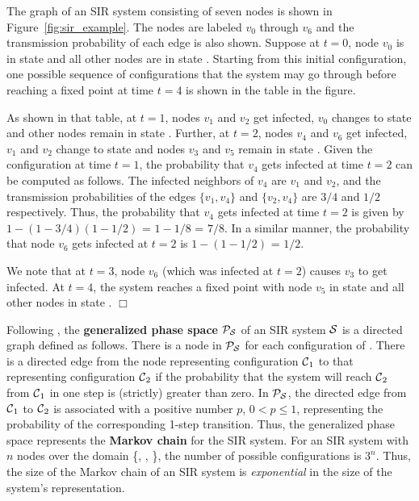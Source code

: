 \begin{example} \label{ex:sir_example}
The graph of an SIR system consisting of seven 
nodes is shown in Figure~\ref{fig:sir_example}.
The nodes are labeled $v_0$ through $v_6$ and the transmission
probability of each edge is also shown.
Suppose at $t = 0$, node $v_0$ is in state \istate{} and all
other nodes are in state \sstate. 
Starting from this initial configuration, one possible sequence of 
configurations that the system may
go through before reaching a fixed point at time $t = 4$ is shown
in the table in the figure.

As shown in that table, at $t = 1$, nodes $v_1$ and $v_2$ get infected,
$v_0$ changes to state \rstate{} and other nodes remain in state \sstate.
Further, at $t = 2$, nodes $v_4$ and $v_6$ get infected,
$v_1$ and $v_2$ change to state \rstate{} and nodes $v_3$ and $v_5$
remain in state \sstate.
Given the configuration at time $t = 1$, the probability that $v_4$
gets infected at time $t = 2$ can be computed as follows.
The infected neighbors of $v_4$ are $v_1$ and $v_2$, and the
transmission probabilities of the edges $\{v_1, v_4\}$ and $\{v_2, v_4\}$
are $3/4$ and $1/2$ respectively.
Thus, the probability that $v_4$ gets infected at time $t = 2$ is
given by $1 - (1-3/4)(1-1/2)$ = $1 - 1/8$ = $7/8$.
In a similar manner, the probability that node $v_6$ gets infected
at $t = 2$ is $1 - (1-1/2)$ = $1/2$.

We note that at $t = 3$, node $v_6$ (which was infected at $t = 2$)
causes $v_3$ to get infected.
At $t = 4$, the system reaches a fixed point with node $v_5$ in
state \sstate{} and all other nodes in state \rstate. \hfill $\Box$
\end{example}

\medskip
Following \cite{BH+2011},
the \textbf{generalized phase space} ${\cal P}_{\cal S}$
of an SIR system ${\cal S}$ is a directed graph defined as follows.
There is a node in ${\cal P}_{\cal S}$ for
each configuration of \cals.
There is a directed edge
from the node representing configuration $\mbox{${\cal C}$}_1$ to that representing
configuration $\mbox{${\cal C}$}_2$ if the probability that the system will reach
$\mbox{${\cal C}$}_2$ from $\mbox{${\cal C}$}_1$ in one step is (strictly) greater than zero.
In ${\cal P}_{\cal S}$, the directed edge from $\mbox{${\cal C}$}_1$ to $\mbox{${\cal C}$}_2$
is associated with a positive number $p$, $0 < p \leq 1$,
representing the probability of the corresponding 1-step transition.
Thus, the generalized phase
space represents the \textbf{Markov chain} \cite{MU-2005}
for the SIR system.
For an SIR system with $n$ nodes over the 
domain \{\sstate, \istate, \rstate\},
the number of possible configurations is $3^n$.
Thus, the size of the Markov chain of an SIR system
is \emph{exponential} in the size of the system's representation.

